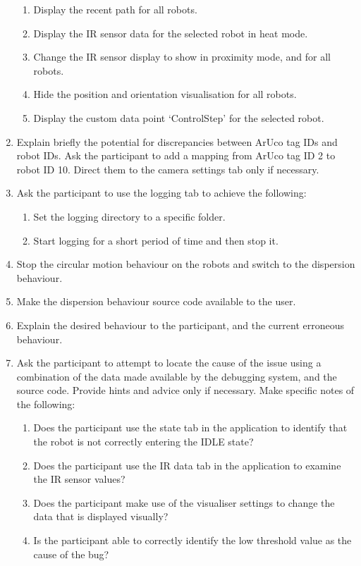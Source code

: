 \begin{enumerate}
\begin{enumerate}
  \item Display the recent path for all robots.
  \item Display the IR sensor data for the selected robot in heat mode.
  \item Change the IR sensor display to show in proximity mode, and for all robots.
  \item Hide the position and orientation visualisation for all robots.
  \item Display the custom data point `ControlStep' for the selected robot.
 \end{enumerate}
 \item Explain briefly the potential for discrepancies between ArUco tag IDs and robot IDs. Ask the participant to add a mapping from ArUco tag ID 2 to robot ID 10. Direct them to the camera settings tab only if necessary.
 \item Ask the participant to use the logging tab to achieve the following:
 \begin{enumerate}
  \item Set the logging directory to a specific folder.
  \item Start logging for a short period of time and then stop it.
 \end{enumerate}
 \item Stop the circular motion behaviour on the robots and switch to the dispersion behaviour.
 \item Make the dispersion behaviour source code available to the user.
 \item Explain the desired behaviour to the participant, and the current erroneous behaviour.
 \item Ask the participant to attempt to locate the cause of the issue using a combination of the data made available by the debugging system, and the source code. Provide hints and advice only if necessary. Make specific notes of the following:
 \begin{enumerate}
  \item Does the participant use the state tab in the application to identify that the robot is not correctly entering the IDLE state?
  \item Does the participant use the IR data tab in the application to examine the IR sensor values?
  \item Does the participant make use of the visualiser settings to change the data that is displayed visually?
  \item Is the participant able to correctly identify the low threshold value as the cause of the bug?
 \end{enumerate}
\end{enumerate}

